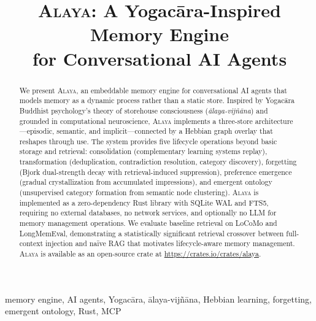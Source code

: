 \documentclass[conference]{IEEEtran}
\newcommand{\sys}[1]{\textsc{#1}}
\newcommand{\alaya}{\sys{Alaya}}
\begin{document}
\title{\alaya{}: A Yogac\=ara-Inspired Memory Engine\\for Conversational AI Agents}

\author{
}

\maketitle

\begin{abstract}
We present \alaya{}, an embeddable memory engine for conversational AI
agents that models memory as a dynamic process rather than a static store.
Inspired by Yogac\=ara Buddhist psychology's theory of storehouse
consciousness (\emph{\=alaya-vij\~n\=ana}) and grounded in computational
neuroscience, \alaya{} implements a three-store architecture---episodic,
semantic, and implicit---connected by a Hebbian graph overlay that reshapes
through use. The system provides five lifecycle operations beyond basic
storage and retrieval: consolidation (complementary learning systems
replay), transformation (deduplication, contradiction resolution, category
discovery), forgetting (Bjork dual-strength decay with retrieval-induced
suppression), preference emergence (gradual crystallization from accumulated
impressions), and emergent ontology (unsupervised category formation from
semantic node clustering). \alaya{} is implemented as a zero-dependency Rust
library with SQLite WAL and FTS5, requiring no external databases, no
network services, and optionally no LLM for memory management operations.
We evaluate baseline retrieval on LoCoMo and LongMemEval, demonstrating a
statistically significant retrieval crossover between full-context injection
and na\"ive RAG that motivates lifecycle-aware memory management. \alaya{}
is available as an open-source crate at
\url{https://crates.io/crates/alaya}.
\end{abstract}

\begin{IEEEkeywords}
memory engine, AI agents, Yogac\=ara, \=alaya-vij\~n\=ana, Hebbian
learning, forgetting, emergent ontology, Rust, MCP
\end{IEEEkeywords}










\def\UrlBreaks{\do\/\do-\do.\do=\do_\do?\do&\do\%\do\#\do\~}


\end{document}
